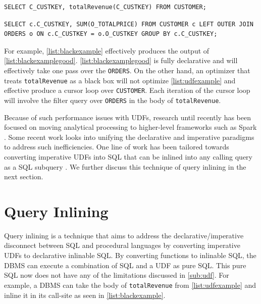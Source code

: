\documentclass[12pt]{cmuthesis}
\begin{document}
\begin{listing}
    \begin{verbatim}
SELECT C_CUSTKEY, totalRevenue(C_CUSTKEY) FROM CUSTOMER;
    \end{verbatim}
    \caption{An invocation of totalRevenue from \cref{list:udfexample}. Many optimizers do not read into the definition of \texttt{totalRevenue} and produce a suboptimal plan.}
    \label{list:blackexample}
    \end{listing}


    \begin{listing}
        \begin{verbatim}
SELECT c.C_CUSTKEY, SUM(O_TOTALPRICE) FROM CUSTOMER c LEFT OUTER JOIN ORDERS o ON c.C_CUSTKEY = o.O_CUSTKEY GROUP BY c.C_CUSTKEY;
        \end{verbatim}
        \caption{Optimized equivalent of \cref{list:blackexample}}
        \label{list:blackexamplegood}
        \end{listing}

For example, \cref{list:blackexample} effectively produces the output of \cref{list:blackexamplegood}. \cref{list:blackexamplegood} is fully declarative and will effectively take one pass over the \texttt{ORDERS}. On the other hand, an optimizer that treats \texttt{totalRevenue} as a black box will not optimize \cref{list:udfexample} and effective produce a cursor loop over \texttt{CUSTOMER}. Each iteration of the cursor loop will involve the filter query over \texttt{ORDERS} in the body of \texttt{totalRevenue}.
    
Because of such performance issues with UDFs, research until recently has been focused on moving analytical processing to higher-level frameworks such as Spark \cite{Armbrust15}. Some recent work looks into unifying the declarative and imperative paradigms to address such inefficiencies. One line of work has been tailored towards converting imperative UDFs into SQL that can be inlined into any calling query as a SQL subquery \cite{ramachandra19}. We further discuss this technique of query inlining in the next section.

\section{Query Inlining}
\label{sec:inlining}
Query inlining is a technique that aims to address the declarative/imperative disconnect between SQL and procedural languages by converting imperative UDFs to declarative inlinable SQL. By converting functions to inlinable SQL, the DBMS can execute a combination of SQL and a UDF as pure SQL. This pure SQL now does not have any of the limitations discussed in \cref{sub:udf}. For example, a DBMS can take the body of \texttt{totalRevenue} from \cref{list:udfexample} and inline it in its call-site as seen in \cref{list:blackexample}.
\end{document}
